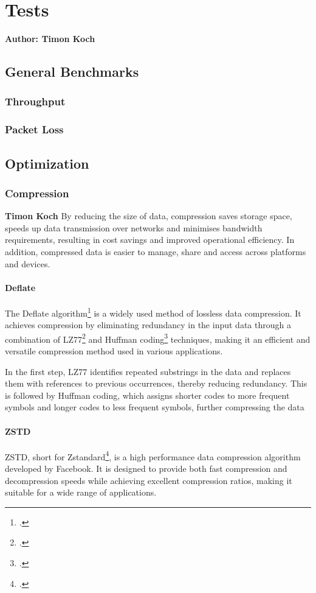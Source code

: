 \chapter{Tests}

\textbf{Author: Timon Koch}

\section{General Benchmarks}
\subsection{Throughput}
\subsection{Packet Loss}

\section{Optimization}
\subsection{Compression}
\textbf{Timon Koch}
By reducing the size of data, compression saves storage space, speeds up data transmission over networks and minimises bandwidth requirements, resulting in cost savings and improved operational efficiency. In addition, compressed data is easier to manage, share and access across platforms and devices. 

\subsubsection{Deflate}
The Deflate algorithm\footcite{deflate} is a widely used method of lossless data compression. It achieves compression by eliminating redundancy in the input data through a combination of LZ77\footcite{lz77} and Huffman coding\footcite{huffman_coding} techniques, making it an efficient and versatile compression method used in various applications.

In the first step, LZ77 identifies repeated substrings in the data and replaces them with references to previous occurrences, thereby reducing redundancy. This is followed by Huffman coding, which assigns shorter codes to more frequent symbols and longer codes to less frequent symbols, further compressing the data

\subsubsection{ZSTD}
ZSTD, short for Zstandard\footcite{zstd}, is a high performance data compression algorithm developed by Facebook. It is designed to provide both fast compression and decompression speeds while achieving excellent compression ratios, making it suitable for a wide range of applications.

